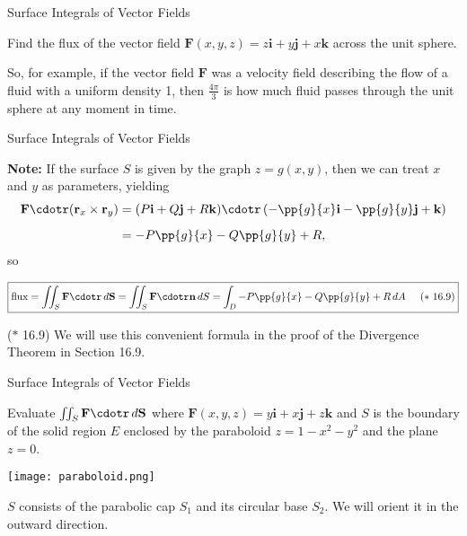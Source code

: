 \documentclass[11pt,english,
handout
]{beamer}
\begin{document}
\begin{frame}[t]{Surface Integrals of Vector Fields}
\small
\begin{example}
Find the flux of the vector field $\mathbf{F}(x,y,z)=z\mathbf{i}+y\mathbf{j}+x\mathbf{k}$ across the unit sphere.

\lspace
So, for example, if the vector field $\mathbf{F}$ was a velocity field describing the flow of a fluid with a uniform density 1, then $\frac{4\pi}{3}$ is how much fluid passes through the unit sphere at any moment in time.
\end{example}
\end{frame}










\begin{frame}{Surface Integrals of Vector Fields}
\small

\textbf{Note:} If the surface $S$ is given by the graph $z=g(x,y)$, then we can treat $x$ and $y$ as parameters, yielding 
\begin{align*}
\mathbf{F}\cdotr(\mathbf{r}_x\times\mathbf{r}_y)&=(P\mathbf{i}+Q\mathbf{j}+R\mathbf{k})\cdotr\left(-\pp{g}{x}\mathbf{i}-\pp{g}{y}\mathbf{j}+\mathbf{k}\right)\\[2mm]
&=-P\pp{g}{x}-Q\pp{g}{y}+R,
\end{align*}
so

\[
\boxed{\text{flux}=\iint_S\mathbf{F}\cdotr\,d\mathbf{S}=\iint_S\mathbf{F}\cdotr\mathbf{n}\,dS=\int_D-P\pp{g}{x}-Q\pp{g}{y}+R\,dA\hspace{5mm}\text{($*$ 16.9)}}
\]

($*$ 16.9) We will use this convenient formula in the proof of the Divergence Theorem in Section 16.9.
\end{frame}










\begin{frame}[t]{Surface Integrals of Vector Fields}
\small
\begin{example}
Evaluate $\iint_S\mathbf{F}\cdotr\,d\mathbf{S}$ where $\mathbf{F}(x,y,z)=y\mathbf{i}+x\mathbf{j}+z\mathbf{k}$ and $S$ is the boundary of the solid region $E$ enclosed by the paraboloid $z=1-x^2-y^2$ and the plane $z=0$.\pause 


\begin{center}
\texttt{[image: paraboloid.png]}
\end{center}
\vspace{-3mm}
$S$ consists of the parabolic cap $S_1$ and its circular base $S_2$. We will orient it in the outward direction. 
\end{example}
\end{frame}
\end{document}
